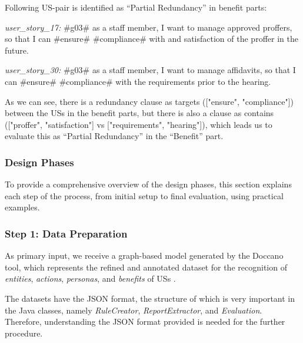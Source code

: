 \begin{example}
	Following US-pair is identified as \enquote{Partial Redundancy} in benefit parts:
	
	\textit{user\_story\_17:} \#g03\# as a staff member, I want to manage approved proffers, so that I can \#ensure\# \#compliance\# with and satisfaction of the proffer in the future.
	
	\textit{user\_story\_30:} \#g03\# as a staff member, I want to manage affidavits, so that I can \#ensure\# \#compliance\# with the requirements prior to the hearing.
	
	As we can see, there is a redundancy clause as targets (["ensure", "compliance"]) between the USs in the benefit parts, but there is also a clause as contains (["proffer", "satisfaction"] vs ["requirements", "hearing"]), which leads us to evaluate this as \enquote{Partial Redundancy} in the \enquote{Benefit} part.
\end{example}
\subsubsection*{Design Phases}\label{design_phases}
To provide a comprehensive overview of the design phases, this section explains each step of the process, from initial setup to final evaluation, using practical examples.
\subsubsection*{Step 1: Data Preparation}\label{design_step_1}
As primary input, we receive a graph-based model generated by the Doccano tool, which represents the refined and annotated dataset for the recognition of \emph{entities}, \emph{actions}, \emph{personas}, and \emph{benefits} of USs \cite{arulmohan2023extracting}.

The datasets have the JSON format, the structure of which is very important in the Java classes, namely \textit{RuleCreator}, \textit{ReportExtractor}, and \textit{Evaluation}. Therefore, understanding the JSON format provided is needed for the further procedure.

